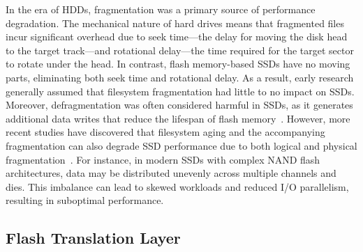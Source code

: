 In the era of HDDs, fragmentation was a primary source of performance degradation.
The mechanical nature of hard drives means that fragmented files incur significant overhead due to seek time---the delay for moving the disk head to the target track---and rotational delay---the time required for the target sector to rotate under the head.
In contrast, flash memory-based SSDs have no moving parts, eliminating both seek time and rotational delay.
As a result, early research generally assumed that filesystem fragmentation had little to no impact on SSDs.
Moreover, defragmentation was often considered harmful in SSDs, as it generates additional data writes that reduce the lifespan of flash memory~\cite{defrag-mobile:atc17,defrag-lfs:apsys16,parallel-defrag:sac22,Defragmentation_read_collision}.
However, more recent studies have discovered that filesystem aging and the accompanying fragmentation can also degrade SSD performance due to both logical and physical fragmentation~\cite{Problem_in_SSD_Empirical,senescence:fast17,Problem_in_SSD_Mobile_Devices,survey:ictc23,fragpicker:sosp21,no-afraid:fast24}.
For instance, in modern SSDs with complex NAND flash architectures, data may be distributed unevenly across multiple channels and dies.
This imbalance can lead to skewed workloads and reduced I/O parallelism, resulting in suboptimal performance.



\subsection{Flash Translation Layer}\label{ss:ftl}

